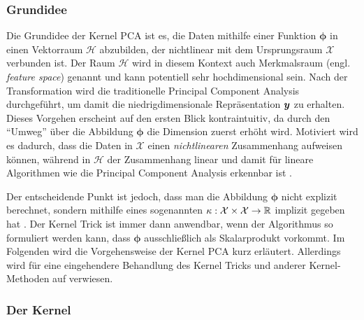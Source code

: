 \subsubsection{Grundidee}
\label{ch:MethodenDerDimRed:statistisch:kPCA:Grundidee}

Die Grundidee der Kernel PCA ist es, die Daten mithilfe einer Funktion $\bm{\phi}$ in einen
Vektorraum $\mathcal{H}$ abzubilden, der nichtlinear mit dem Ursprungsraum $\mathcal{X}$ verbunden
ist. Der Raum $\mathcal{H}$ wird in diesem Kontext auch Merkmalsraum (engl. \textit{feature space})
genannt und kann potentiell sehr hochdimensional sein. Nach der Transformation wird die
traditionelle Principal Component Analysis durchgeführt, um damit die niedrigdimensionale
Repräsentation $\bm{y}$ zu erhalten. Dieses Vorgehen erscheint auf den ersten Blick
kontraintuitiv, da durch den \enquote{Umweg} über die Abbildung $\bm{\phi}$ die Dimension zuerst
erhöht wird. Motiviert wird es dadurch, dass die Daten in $\mathcal{X}$ einen
\textit{nichtlinearen} Zusammenhang aufweisen können, während in $\mathcal{H}$ der Zusammenhang
linear und damit für lineare Algorithmen wie die Principal Component Analysis erkennbar ist \parencite[vgl.][26]{ShaweTaylor.2011}.

Der entscheidende Punkt ist jedoch, dass man die Abbildung $\bm{\phi}$ nicht explizit berechnet,
sondern mithilfe eines sogenannten  $\kappa: \mathcal{X} \times \mathcal{X}
	\rightarrow \mathbb{R}$ implizit gegeben hat \parencites[586 -- 588]{Bishop.2006}[583]{Scholkopf.1997}. Der Kernel Trick ist immer dann anwendbar,
wenn der Algorithmus so formuliert werden kann, dass $\bm{\phi}$ ausschließlich als Skalarprodukt
vorkommt. Im Folgenden wird die Vorgehensweise der Kernel PCA kurz erläutert. Allerdings wird für
eine eingehendere Behandlung des Kernel Tricks und anderer Kernel-Methoden auf
\textcite{ShaweTaylor.2011} verwiesen.

\subsubsection{Der Kernel}
\label{ch:MethodenDerDimRed:statistisch:kPCA:KernelFunktion}

